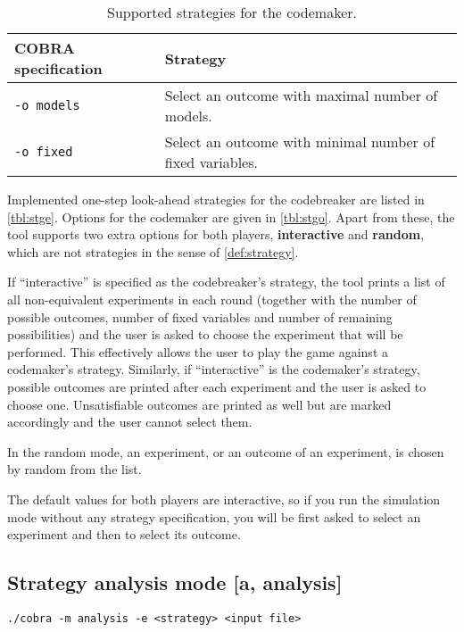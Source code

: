 \begin{table}[h!]
\begin{center}
\begin{tabular}{|l|p{7cm}|} \hline
COBRA specification & Strategy \\\hline
 \texttt{-o models} & Select an outcome with maximal number of models. \\
\texttt{-o fixed} & Select an outcome with minimal number of fixed variables. \\\hline
\end{tabular}
\caption{Supported strategies for the codemaker.} \label{tbl:stgo}
\end{center}
\end{table}

Implemented one-step look-ahead strategies for the codebreaker
  are listed in \autoref{tbl:stge}.
Options for the codemaker are given in \autoref{tbl:stgo}.
Apart from these, the tool supports two extra options for both players,
  \textbf{interactive} and \textbf{random},
  which are not strategies in the sense of \autoref{def:strategy}.

If ``interactive'' is specified as the codebreaker's strategy,
  the tool prints a list of all non-equivalent experiments in each round
  (together with the number of possible outcomes, number of fixed variables
  and number of remaining possibilities) and the user is asked
  to choose the experiment that will be performed.
This effectively allows the user to play the game against a codemaker's strategy.
Similarly, if ``interactive'' is the codemaker's strategy, possible outcomes
  are printed after each experiment and the user is asked to choose one.
Unsatisfiable outcomes are printed as well but are marked accordingly
  and the user cannot select them.

In the random mode, an experiment, or an outcome of an experiment, is
  chosen by random from the list.

The default values for both players are interactive,
  so if you run the simulation mode without any strategy specification,
  you will be first asked to select an experiment and then to select its outcome.

\subsection{Strategy analysis mode [a, analysis]}

\centerline{\texttt{./cobra -m analysis -e <strategy> <input file> }}

